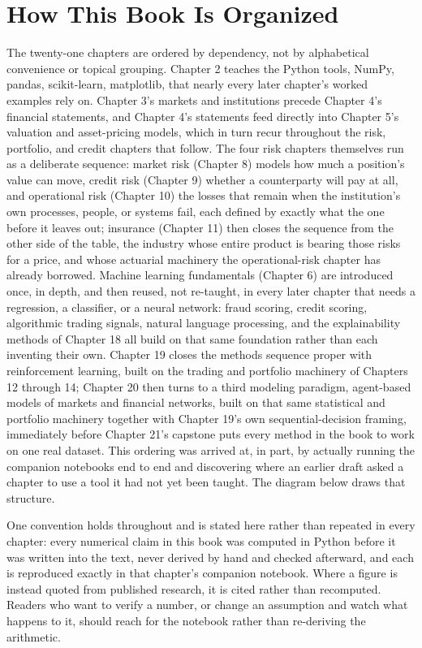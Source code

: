 \documentclass{book}
\begin{document}
\section*{How This Book Is Organized}

The twenty-one chapters are ordered by dependency, not by alphabetical convenience or topical grouping. Chapter 2 teaches 
the Python tools, NumPy, pandas, scikit-learn, matplotlib, that nearly every later chapter's worked examples rely on. 
Chapter 3's markets and institutions precede Chapter 4's financial statements, and Chapter 4's statements feed directly 
into Chapter 5's valuation and asset-pricing models, which in turn recur throughout the risk, portfolio, and credit 
chapters that follow. The four risk chapters themselves run as a deliberate sequence: market risk (Chapter 8) models 
how much a position's value can move, credit risk (Chapter 9) whether a counterparty will pay at all, and operational 
risk (Chapter 10) the losses that remain when the institution's own processes, people, or systems fail, each defined by 
exactly what the one before it leaves out; insurance (Chapter 11) then closes the sequence from the other side of the 
table, the industry whose entire product is bearing those risks for a price, and whose actuarial machinery the 
operational-risk chapter has already borrowed. Machine learning fundamentals (Chapter 6) are introduced once, in depth, 
and then reused, not re-taught, in every later chapter that needs a regression, a classifier, or a neural network: 
fraud scoring, credit scoring, algorithmic trading signals, natural language processing, and the explainability methods 
of Chapter 18 all build on that same foundation rather than each inventing their own. Chapter 19 closes the methods 
sequence proper with reinforcement learning, built on the trading and portfolio machinery of Chapters 12 through 14; 
Chapter 20 then turns to a third modeling paradigm, agent-based models of markets and financial networks, built on that 
same statistical and portfolio machinery together with Chapter 19's own sequential-decision framing, immediately before 
Chapter 21's capstone puts every method in the book to work on one real dataset. This ordering was arrived at, in part, 
by actually running the companion notebooks end to end and discovering where an earlier draft asked a chapter to use a
tool it had not yet been taught. The diagram below draws that structure.

One convention holds throughout and is stated here rather than repeated in every chapter: every numerical claim in this
book was computed in Python before it was written into the text, never derived by hand and checked afterward, and each
is reproduced exactly in that chapter's companion notebook. Where a figure is instead quoted from published research, it
is cited rather than recomputed. Readers who want to verify a number, or change an assumption and watch what happens to
it, should reach for the notebook rather than re-deriving the arithmetic.
\end{document}
